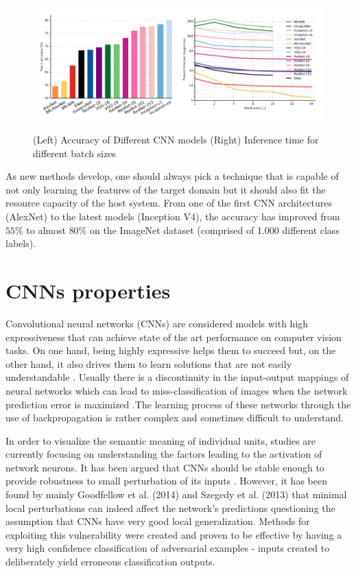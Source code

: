 \begin{figure}[!h]
	\centering
	\includegraphics[scale=0.6]{network_comparison.png}
	\caption{(Left) Accuracy of Different CNN models (Right) Inference time for different batch sizes}
	\cite{canziani2016analysis}
	\label{fig:cnn_comparison}
\end{figure}

As new methods develop, one should always pick a technique that is capable of not only learning the features of the target domain but it should also fit the resource capacity of the host system. From one of the first CNN architectures (AlexNet) to the latest models (Inception V4), the accuracy has improved from $55\%$ to almost $80\%$ on the ImageNet dataset (comprised of 1.000 different class labels).

\section{CNNs properties}\label{subsec: nn_props}

Convolutional neural networks (CNNs) are considered models with high expressiveness that can achieve state of the art performance on computer vision tasks. On one hand, being highly expressive helps them to succeed but, on the other hand, it also drives them to learn solutions that are not easily understandable \cite{szegedy2013}. Usually there is a discontinuity in the input-output mappings of neural networks which can lead to miss-classification of images when the network prediction error is maximized \cite{gu2014}.The learning process of these networks through the use of backpropagation is rather complex and sometimes difficult to understand.

In order to visualize the semantic meaning of individual units, studies are currently focusing on understanding the factors leading to the activation of network neurons. It has been argued that CNNs should be stable enough to provide robustness to small perturbation of its inputs \cite{szegedy2013}. However, it has been found by mainly Goodfellow et al. (2014) and Szegedy et al. (2013) that minimal local perturbations can indeed affect the network's predictions questioning the assumption that CNNs have very good local generalization. Methods for exploiting this vulnerability were created and proven to be effective by having a very high confidence classification of adversarial examples \cite{goodfellow2016} - inputs created to deliberately yield erroneous classification outputs.

